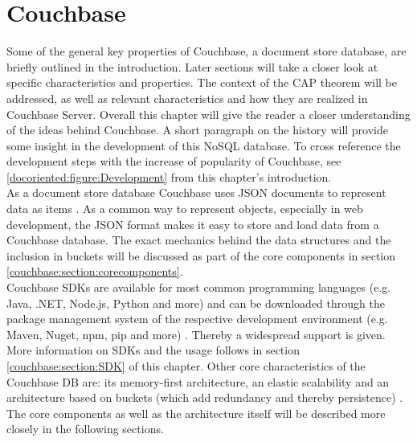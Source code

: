 \section{Couchbase}
Some of the general key properties of Couchbase, a document store database, are briefly outlined in the introduction. Later sections will take a closer look at specific characteristics and properties. The context of the CAP theorem will be addressed, as well as relevant characteristics and how they are realized in Couchbase Server. Overall this chapter will give the reader a closer understanding of the ideas behind Couchbase. A short paragraph on the history will provide some insight in the development of this NoSQL database. To cross reference the development steps with the increase of popularity of Couchbase, see \autoref{docoriented:figure:Development} from this chapter’s introduction.\\
As a document store database Couchbase uses JSON documents to represent data as items \parencite{couchbaseAbout} \parencite{objelean}. As a common way to represent objects, especially in web development, the JSON format makes it easy to store and load data from a Couchbase database. The exact mechanics behind the data structures and the inclusion in buckets will be discussed as part of the core components in section \ref{couchbase:section:corecomponents}.\\
Couchbase SDKs are available for most common programming languages (e.g. Java, .NET, Node.js, Python and more) and can be downloaded through the package management system of the respective development environment (e.g. Maven, Nuget, npm, pip and more) \parencite{couchbaseWeb} \parencite{objelean}. Thereby a widespread support is given. More information on SDKs and the usage follows in section \ref{couchbase:section:SDK} of this chapter.
Other core characteristics of the Couchbase DB are: its memory-first architecture, an elastic scalability and an architecture based on buckets (which add redundancy and thereby persistence) \parencite{couchbaseWeb}. The core components as well as the architecture itself will be described more closely in the following sections.

